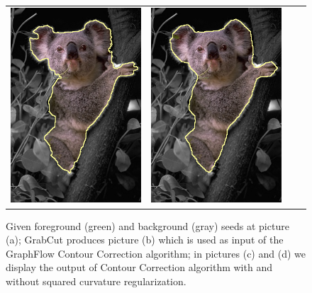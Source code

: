 \begin{figure}
\begin{tabular}{cccc}
 	\includegraphics[scale=0.25]{figures/chapter8/segmentation/coala/k-0.0/corrected-seg.png} &  	
 	\includegraphics[scale=0.25]{figures/chapter8/segmentation/coala/k-1.0/corrected-seg.png}
\end{tabular}	
\caption{Given foreground (green) and background (gray) seeds at picture (a); GrabCut produces picture (b) which is used as input of the GraphFlow Contour Correction algorithm; in pictures (c) and (d) we display the output of Contour Correction algorithm with and without squared curvature regularization. }
\label{fig:ch8-segmentation}
\end{figure}

